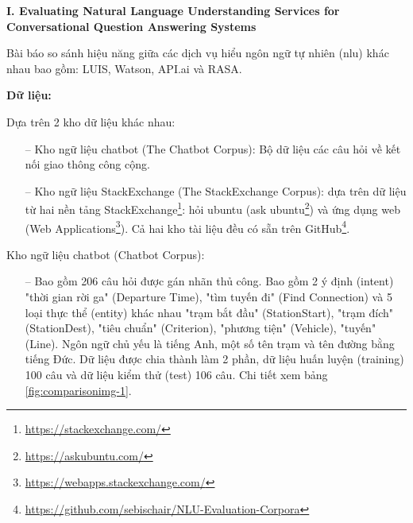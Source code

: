 \textbf{I. Evaluating Natural Language Understanding Services for Conversational Question Answering Systems}

Bài báo so sánh hiệu năng giữa các dịch vụ hiểu ngôn ngữ tự nhiên (\ac{nlu}) khác nhau bao gồm: LUIS, Watson, API.ai và RASA.

\textbf{Dữ liệu:}

Dựa trên 2 kho dữ liệu khác nhau:
\begin{itemize}
    \item[--] Kho ngữ liệu chatbot (The Chatbot Corpus): Bộ dữ liệu các câu hỏi về kết nối giao thông công cộng.
    \item[--] Kho ngữ liệu StackExchange (The StackExchange Corpus): dựa trên dữ liệu từ hai nền tảng StackExchange\footnote{\url{https://stackexchange.com/}}: hỏi ubuntu (ask ubuntu\footnote{\url{https://askubuntu.com/}}) và ứng dụng web (Web Applications\footnote{\url{https://webapps.stackexchange.com/}}). Cả hai kho tài liệu đều có sẵn trên GitHub\footnote{\url{https://github.com/sebischair/NLU-Evaluation-Corpora}}.
\end{itemize}

Kho ngữ liệu chatbot (Chatbot Corpus):

\begin{itemize}
    \item[--] Bao gồm 206 câu hỏi được gán nhãn thủ công. Bao gồm 2 ý định (intent) "thời gian rời ga" (Departure Time), "tìm tuyến đi" (Find Connection) và 5 loại thực thể (entity) khác nhau "trạm bắt đầu" (StationStart), "trạm đích"  (StationDest), "tiêu chuẩn" (Criterion), "phương tiện" (Vehicle), "tuyến" (Line). Ngôn ngữ chủ yếu là tiếng Anh, một số tên trạm và tên đường bằng tiếng Đức. Dữ liệu được chia thành làm 2 phần, dữ liệu huấn luyện (training) 100 câu và dữ liệu kiểm thử (test) 106 câu. Chi tiết xem bảng \ref{fig:comparisonimg-1}.
\end{itemize}



